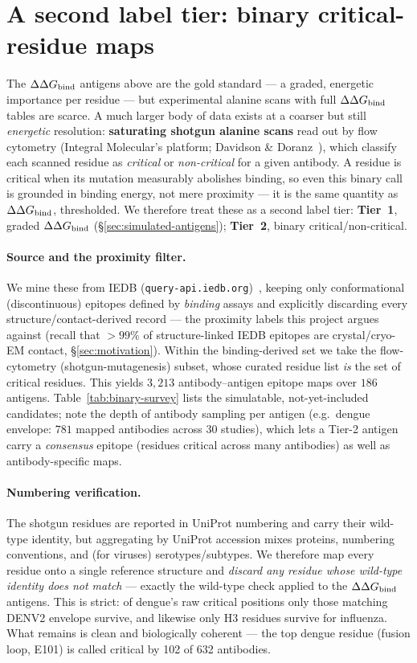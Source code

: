 \section{A second label tier: binary critical-residue maps}\label{sec:binary-labels}

The $\Delta\Delta G_{\mathrm{bind}}$ antigens above are the gold standard --- a graded, energetic importance per
residue --- but experimental alanine scans with full $\Delta\Delta G_{\mathrm{bind}}$ tables are scarce. A much larger
body of data exists at a coarser but still \emph{energetic} resolution: \textbf{saturating
shotgun alanine scans} read out by flow cytometry (Integral Molecular's platform; Davidson \&
Doranz~\cite{davidson2014}), which classify each scanned residue as \emph{critical} or \emph{non-critical} for a
given antibody. A residue is critical when its mutation measurably abolishes binding, so even
this binary call is grounded in binding energy, not mere proximity --- it is the same
quantity as $\Delta\Delta G_{\mathrm{bind}}$, thresholded. We therefore treat these as a second label tier:
\textbf{Tier~1}, graded $\Delta\Delta G_{\mathrm{bind}}$ (\S\ref{sec:simulated-antigens}); \textbf{Tier~2}, binary
critical/non-critical.

\paragraph{Source and the proximity filter.} We mine these from IEDB
(\texttt{query-api.iedb.org})~\cite{vita2019}, keeping only conformational (discontinuous) epitopes defined by
\emph{binding} assays and explicitly discarding every structure/contact-derived record --- the
proximity labels this project argues against (recall that $>99\%$ of structure-linked IEDB
epitopes are crystal/cryo-EM contact, \S\ref{sec:motivation}). Within the binding-derived set
we take the flow-cytometry (shotgun-mutagenesis) subset, whose curated residue list \emph{is}
the set of critical residues. This yields $3{,}213$ antibody--antigen epitope maps over
$186$ antigens. Table~\ref{tab:binary-survey} lists the simulatable, not-yet-included
candidates; note the depth of antibody sampling per antigen (e.g.\ dengue envelope: $781$
mapped antibodies across $30$ studies), which lets a Tier-2 antigen carry a
\emph{consensus} epitope (residues critical across many antibodies) as well as
antibody-specific maps.



\paragraph{Numbering verification.} The shotgun residues are reported in UniProt numbering and
carry their wild-type identity, but aggregating by UniProt accession mixes proteins, numbering
conventions, and (for viruses) serotypes/subtypes. We therefore map every residue onto a single
reference structure and \emph{discard any residue whose wild-type identity does not match} ---
exactly the wild-type check applied to the $\Delta\Delta G_{\mathrm{bind}}$ antigens. This is strict: of dengue's raw
critical positions only those matching DENV2 envelope survive, and likewise only H3 residues
survive for influenza. What remains is clean and biologically coherent --- the top dengue residue
(fusion loop, E101) is called critical by 102 of 632 antibodies.

